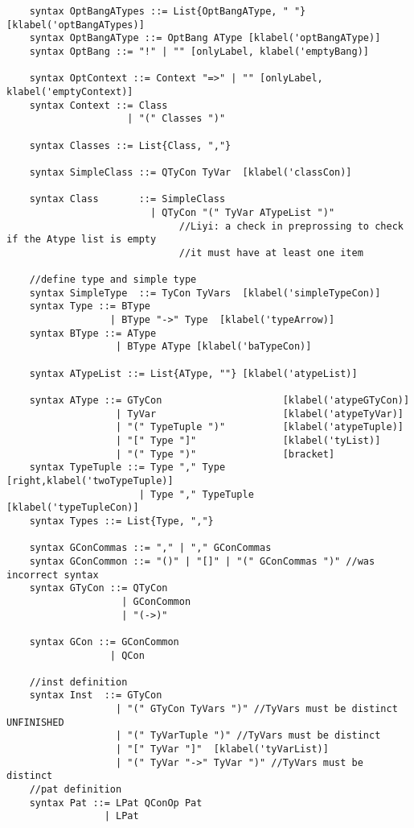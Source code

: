 \begin{lstlisting}
    syntax OptBangATypes ::= List{OptBangAType, " "} [klabel('optBangATypes)]
    syntax OptBangAType ::= OptBang AType [klabel('optBangAType)]
    syntax OptBang ::= "!" | "" [onlyLabel, klabel('emptyBang)]

    syntax OptContext ::= Context "=>" | "" [onlyLabel, klabel('emptyContext)]
    syntax Context ::= Class
                     | "(" Classes ")"

    syntax Classes ::= List{Class, ","}

    syntax SimpleClass ::= QTyCon TyVar  [klabel('classCon)]

    syntax Class       ::= SimpleClass
                         | QTyCon "(" TyVar ATypeList ")"
                              //Liyi: a check in preprossing to check if the Atype list is empty
                              //it must have at least one item

    //define type and simple type
    syntax SimpleType  ::= TyCon TyVars  [klabel('simpleTypeCon)]
    syntax Type ::= BType
                  | BType "->" Type  [klabel('typeArrow)]
    syntax BType ::= AType
                   | BType AType [klabel('baTypeCon)]

    syntax ATypeList ::= List{AType, ""} [klabel('atypeList)]

    syntax AType ::= GTyCon                     [klabel('atypeGTyCon)]
                   | TyVar                      [klabel('atypeTyVar)]
                   | "(" TypeTuple ")"          [klabel('atypeTuple)]
                   | "[" Type "]"               [klabel('tyList)]
                   | "(" Type ")"               [bracket]
    syntax TypeTuple ::= Type "," Type          [right,klabel('twoTypeTuple)]
                       | Type "," TypeTuple     [klabel('typeTupleCon)]
    syntax Types ::= List{Type, ","}

    syntax GConCommas ::= "," | "," GConCommas
    syntax GConCommon ::= "()" | "[]" | "(" GConCommas ")" //was incorrect syntax
    syntax GTyCon ::= QTyCon
                    | GConCommon
                    | "(->)"

    syntax GCon ::= GConCommon
                  | QCon

    //inst definition
    syntax Inst  ::= GTyCon
                   | "(" GTyCon TyVars ")" //TyVars must be distinct UNFINISHED
                   | "(" TyVarTuple ")" //TyVars must be distinct
                   | "[" TyVar "]"  [klabel('tyVarList)]
                   | "(" TyVar "->" TyVar ")" //TyVars must be distinct
    //pat definition
    syntax Pat ::= LPat QConOp Pat
                 | LPat


\end{lstlisting}
